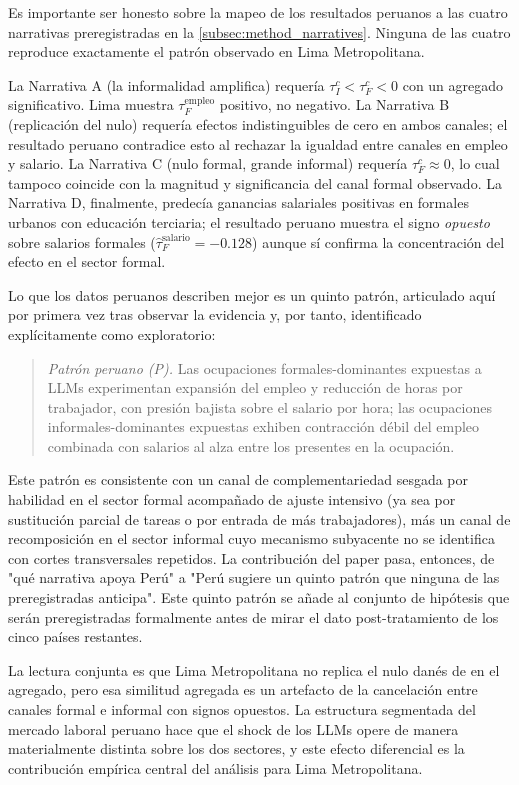 Es importante ser honesto sobre la mapeo de los resultados peruanos a las cuatro narrativas preregistradas en la \cref{subsec:method_narratives}. Ninguna de las cuatro reproduce exactamente el patr\'{o}n observado en Lima Metropolitana.

La Narrativa A (la informalidad amplifica) requer\'{i}a $\tau_I^c < \tau_F^c < 0$ con un agregado significativo. Lima muestra $\tau_F^{\text{empleo}}$ positivo, no negativo. La Narrativa B (replicaci\'{o}n del nulo) requer\'{i}a efectos indistinguibles de cero en ambos canales; el resultado peruano contradice esto al rechazar la igualdad entre canales en empleo y salario. La Narrativa C (nulo formal, grande informal) requer\'{i}a $\tau_F^c \approx 0$, lo cual tampoco coincide con la magnitud y significancia del canal formal observado. La Narrativa D, finalmente, predec\'{i}a ganancias salariales positivas en formales urbanos con educaci\'{o}n terciaria; el resultado peruano muestra el signo \emph{opuesto} sobre salarios formales ($\hat\tau_F^{\text{salario}} = -0.128$) aunque s\'{i} confirma la concentraci\'{o}n del efecto en el sector formal.

Lo que los datos peruanos describen mejor es un quinto patr\'{o}n, articulado aqu\'{i} por primera vez tras observar la evidencia y, por tanto, identificado expl\'{i}citamente como exploratorio:
\begin{quote}
\emph{Patr\'{o}n peruano (P).} Las ocupaciones formales-dominantes expuestas a LLMs experimentan expansi\'{o}n del empleo y reducci\'{o}n de horas por trabajador, con presi\'{o}n bajista sobre el salario por hora; las ocupaciones informales-dominantes expuestas exhiben contracci\'{o}n d\'{e}bil del empleo combinada con salarios al alza entre los presentes en la ocupaci\'{o}n.
\end{quote}
Este patr\'{o}n es consistente con un canal de complementariedad sesgada por habilidad en el sector formal acompa\~{n}ado de ajuste intensivo (ya sea por sustituci\'{o}n parcial de tareas o por entrada de m\'{a}s trabajadores), m\'{a}s un canal de recomposici\'{o}n en el sector informal cuyo mecanismo subyacente no se identifica con cortes transversales repetidos. La contribuci\'{o}n del paper pasa, entonces, de "qu\'{e} narrativa apoya Per\'{u}" a "Per\'{u} sugiere un quinto patr\'{o}n que ninguna de las preregistradas anticipa". Este quinto patr\'{o}n se a\~{n}ade al conjunto de hip\'{o}tesis que ser\'{a}n preregistradas formalmente antes de mirar el dato post-tratamiento de los cinco pa\'{i}ses restantes.

La lectura conjunta es que Lima Metropolitana no replica el nulo dan\'{e}s de \citet{HumlumVestergaard2025_llm} en el agregado, pero esa similitud agregada es un artefacto de la cancelaci\'{o}n entre canales formal e informal con signos opuestos. La estructura segmentada del mercado laboral peruano hace que el shock de los LLMs opere de manera materialmente distinta sobre los dos sectores, y este efecto diferencial es la contribuci\'{o}n emp\'{i}rica central del an\'{a}lisis para Lima Metropolitana.
